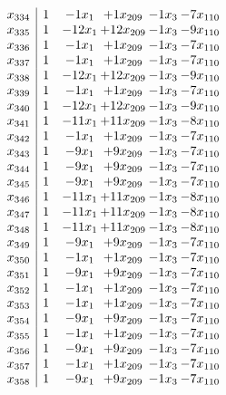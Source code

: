 \documentclass[11pt]{article}
\begin{document}
\[\begin{array}{c| c c@{\hskip 2pt} c@{\hskip 2pt} c@{\hskip 2pt} c@{\hskip 2pt} }
 x_{334}   &  1 & -1 x_{1} & + 1 x_{209} & -1 x_{3} & -7 x_{110}\\
 x_{335}   &  1 & -12 x_{1} & + 12 x_{209} & -1 x_{3} & -9 x_{110}\\
 x_{336}   &  1 & -1 x_{1} & + 1 x_{209} & -1 x_{3} & -7 x_{110}\\
 x_{337}   &  1 & -1 x_{1} & + 1 x_{209} & -1 x_{3} & -7 x_{110}\\
 x_{338}   &  1 & -12 x_{1} & + 12 x_{209} & -1 x_{3} & -9 x_{110}\\
 x_{339}   &  1 & -1 x_{1} & + 1 x_{209} & -1 x_{3} & -7 x_{110}\\
 x_{340}   &  1 & -12 x_{1} & + 12 x_{209} & -1 x_{3} & -9 x_{110}\\
 x_{341}   &  1 & -11 x_{1} & + 11 x_{209} & -1 x_{3} & -8 x_{110}\\
 x_{342}   &  1 & -1 x_{1} & + 1 x_{209} & -1 x_{3} & -7 x_{110}\\
 x_{343}   &  1 & -9 x_{1} & + 9 x_{209} & -1 x_{3} & -7 x_{110}\\
 x_{344}   &  1 & -9 x_{1} & + 9 x_{209} & -1 x_{3} & -7 x_{110}\\
 x_{345}   &  1 & -9 x_{1} & + 9 x_{209} & -1 x_{3} & -7 x_{110}\\
 x_{346}   &  1 & -11 x_{1} & + 11 x_{209} & -1 x_{3} & -8 x_{110}\\
 x_{347}   &  1 & -11 x_{1} & + 11 x_{209} & -1 x_{3} & -8 x_{110}\\
 x_{348}   &  1 & -11 x_{1} & + 11 x_{209} & -1 x_{3} & -8 x_{110}\\
 x_{349}   &  1 & -9 x_{1} & + 9 x_{209} & -1 x_{3} & -7 x_{110}\\
 x_{350}   &  1 & -1 x_{1} & + 1 x_{209} & -1 x_{3} & -7 x_{110}\\
 x_{351}   &  1 & -9 x_{1} & + 9 x_{209} & -1 x_{3} & -7 x_{110}\\
 x_{352}   &  1 & -1 x_{1} & + 1 x_{209} & -1 x_{3} & -7 x_{110}\\
 x_{353}   &  1 & -1 x_{1} & + 1 x_{209} & -1 x_{3} & -7 x_{110}\\
 x_{354}   &  1 & -9 x_{1} & + 9 x_{209} & -1 x_{3} & -7 x_{110}\\
 x_{355}   &  1 & -1 x_{1} & + 1 x_{209} & -1 x_{3} & -7 x_{110}\\
 x_{356}   &  1 & -9 x_{1} & + 9 x_{209} & -1 x_{3} & -7 x_{110}\\
 x_{357}   &  1 & -1 x_{1} & + 1 x_{209} & -1 x_{3} & -7 x_{110}\\
 x_{358}   &  1 & -9 x_{1} & + 9 x_{209} & -1 x_{3} & -7 x_{110}\\

\end{array}\]
\end{document}
